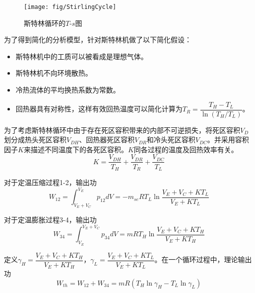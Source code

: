 \noindent \begin{figure}[htbp]
\begin{center}
	\texttt{[image: fig/StirlingCycle]}
	\caption{斯特林循环的$T$-$s$图}
	\label{fig:StirlingCycle}
\end{center}
\end{figure}

为了得到简化的分析模型，针对斯特林机做了以下简化假设：

\begin{itemize}
\item 斯特林机中的工质可以被看成是理想气体。
\item 斯特林机不向环境散热。
\item 冷热流体的平均换热系数为常数。
\item 回热器具有对称性，这样有效回热温度可以简化计算为$T_{R}=\dfrac{T_{H}-T_{L}}{\ln(T_{H}/T_{L})}$\cite{Formosa2010,Juhasz2010}。
\end{itemize}

为了考虑斯特林循环中由于存在死区容积带来的内部不可逆损失，将死区容积$V_D$划分成热头死区容积$V_{DH}$、回热器死区容积$V_{DR}$和冷头死区容积$V_{DC}$\cite{Duan2014}。并采用容积因子$K$来描述不同温度下的各死区容积。$K$同各过程的温度及回热效率有关。
\begin{equation}
	K = \frac{V_{DH}}{T_H} + \frac{V_{DR}}{T_R} + \frac{V_{DC}}{T_L}
\end{equation}

对于定温压缩过程1-2，输出功
\begin{equation}
	W_{12} = \int^{V_E}_{V_E+V_C}{p_{12}dV}=-m_{se}RT_L\ln{\frac{V_E+V_C+KT_L}{V_E+KT_L}}
\end{equation}

对于定温膨胀过程3-4，输出功
\begin{equation}
	W_{34} = \int^{V_E+V_C}_{V_E}{p_{34}dV}=mRT_H\ln{\frac{V_E+V_C+KT_H}{V_E+KT_H}}
\end{equation}

定义$\gamma_H = \dfrac{V_E+V_C+KT_H}{V_E+KT_H}$，$\gamma_L = \dfrac{V_E+V_C+KT_L}{V_E+KT_L}$。在一个循环过程中，理论输出功
\begin{equation}
	W_{th} = W_{12} + W_{34} = mR(T_H\ln\gamma_H - T_L\ln\gamma_L)
\end{equation}

